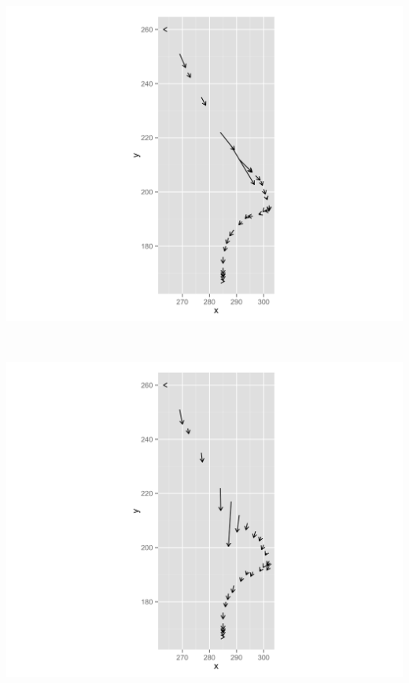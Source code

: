 \begin{minipage}{\linewidth}
	\begin{minipage}{.45\linewidth}
		\includegraphics[width=\linewidth, trim = 20cm 0cm 20cm 0cm, clip]{images/plots/plot_velocity_individual}
		\label{fig:plot_velocity_individual}
	\end{minipage}
	\begin{minipage}[b]{0.1\linewidth}
	~
	\end{minipage}
	\begin{minipage}{.45\linewidth}
		\includegraphics[width=\linewidth, trim = 20cm 0cm 20cm 0cm, clip]{images/plots/plot_velocity_individual_target}
		\label{fig:plot_velocity_individual_target}
	\end{minipage}
\end{minipage}


